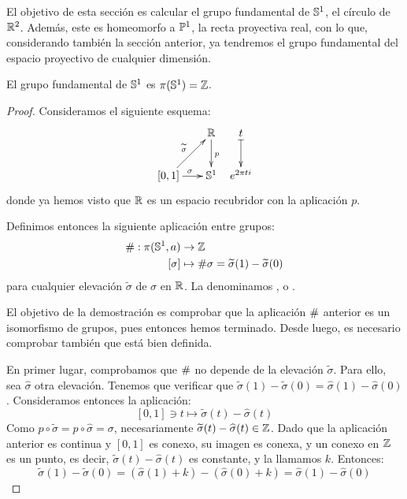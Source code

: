 El objetivo de esta sección es calcular el grupo fundamental de $\mathbb{S}^1$, el círculo de $\mathbb{R}^2$. Además, este es homeomorfo a $\mathbb{P}^1$, la recta proyectiva real, con lo que, considerando también la sección anterior, ya tendremos el grupo fundamental del espacio proyectivo de cualquier dimensión.

\begin{theo}
\label{grf_circulo}

El grupo fundamental de $\mathbb{S}^1$ es $\pi(\mathbb{S}^1)=\mathbb{Z}$.

\begin{proof}
Consideramos el siguiente esquema:
\[\xymatrix @C = 0.5pc {
&&\R \ar[d]^p & t \ar@{|->}[d] \\
[0,1] \ar[rr]^\sigma \ar[rru]^{\widetilde{\sigma}} & & \Sfe^1 & e^{2\pi ti}
}\]
donde ya hemos visto que $\mathbb{R}$ es un espacio recubridor con la aplicación $p$.

Definimos entonces la siguiente aplicación entre grupos:
\[\begin{split}
\mathrm{\#}:\pi(\mathbb{S}^1,a)&\to\mathbb{Z} \\
[\sigma] &\mapsto \mathrm{\#}\sigma = \widetilde{\sigma}(1)-\widetilde{\sigma}(0)
\end{split}\]
para cualquier elevación $\widetilde{\sigma}$ de $\sigma$ en $\mathbb{R}$. La denominamos ,  o .

El objetivo de la demostración es comprobar que la aplicación $\mathrm{\#}$ anterior es un isomorfismo de grupos, pues entonces hemos terminado. Desde luego, es necesario comprobar también que está bien definida.

En primer lugar, comprobamos que $\mathrm{\#}$ no depende de la elevación $\widetilde{\sigma}$. Para ello, sea $\widehat{\sigma}$ otra elevación. Tenemos que verificar que $\widetilde{\sigma}(1)-\widetilde{\sigma}(0) = \widehat{\sigma}(1) - \widehat{\sigma}(0)$. Consideramos entonces la aplicación:
\[[0,1]\ni t\mapsto \widetilde{\sigma}(t) - \widehat{\sigma}(t)\]
Como $p\circ\widetilde{\sigma} = p\circ\widehat{\sigma} = \sigma$, necesariamente $\widetilde{\sigma}(t) - \widehat{\sigma}(t)\in\mathbb{Z}$. Dado que la aplicación anterior es continua y $[0,1]$ es conexo, su imagen es conexa, y un conexo en $\mathbb{Z}$ es un punto, es decir, $\widetilde{\sigma}(t) - \widehat{\sigma}(t)$ es constante, y la llamamos $k$. Entonces:
\[\widetilde{\sigma}(1)-\widetilde{\sigma}(0) = (\widehat{\sigma}(1) + k) - (\widehat{\sigma}(0) + k) = \widehat{\sigma}(1) - \widehat{\sigma}(0)\]


\end{proof}
\end{theo}
